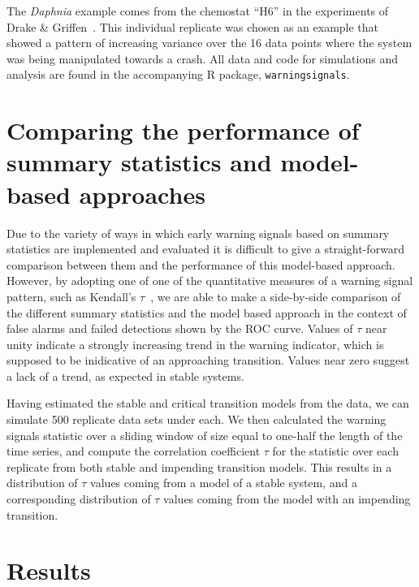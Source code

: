 \documentclass[authoryear,preprint,11pt]{elsarticle}
\begin{document}
The \emph{Daphnia} example comes from the chemostat ``H6'' in the experiments of Drake \& Griffen~\citep{Drake2010}. 
This individual replicate was chosen as an example that showed 
a pattern of increasing variance over the 16 data points where the system was being manipulated towards a crash.
All data and code for simulations and analysis are found in the accompanying R package, \verb|warningsignals|.  



\section{Comparing the performance of summary statistics and model-based approaches}  
Due to the variety of ways in which early warning signals based on summary statistics are implemented and evaluated
it is difficult to give a straight-forward comparison between them and the performance of this model-based approach.
However, by adopting one of one of the quantitative measures of a warning signal pattern, such as Kendall's $\tau$~\citep{Dakos2008, Dakos2011, Dakos2009}, 
we are able to make a side-by-side comparison of the different summary statistics and the model based approach in the
context of false alarms and failed detections shown by the ROC curve.  
Values of $\tau$ near unity indicate a strongly increasing trend in the warning indicator, 
which is supposed to be inidicative of an approaching transition.  
Values near zero suggest a lack of a trend, as expected in stable systems.

Having estimated the stable and critical transition models from the data, 
we can simulate 500 replicate data sets under each⁠. 
We then calculated the warning signals statistic over a sliding window of size equal to one-half the length of the time series,
and compute the correlation coefficient $\tau$ for the statistic over each replicate from both stable and impending transition models.  
This results in a distribution of $\tau$ values coming from a model of a stable system, 
and a corresponding distribution of $\tau$ values coming from the model with an impending transition.  

\section{Results}
\end{document}
